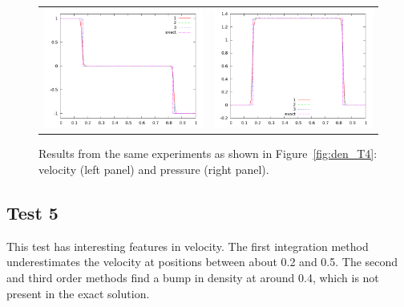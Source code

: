 \documentclass[10pt]{article}
\begin{document}
\begin{figure}
  \begin{center}
	\begin{tabular}{cc}
      \includegraphics[width=.425\textwidth]{vel_T4.png} &
	  \includegraphics[width=.425\textwidth]{prs_T4.png}
	\end{tabular}
  \end{center}
  \caption{Results from the same experiments as shown in Figure~\ref{fig:den_T4}:
  velocity (left panel) and pressure (right panel).}
\end{figure}

\clearpage

\subsection{Test 5}
This test has interesting features in velocity. The first integration method underestimates the velocity at positions between about 0.2 and 0.5. The second and third order methods find a bump in density at around 0.4, which is not present in the exact solution.
\end{document}
